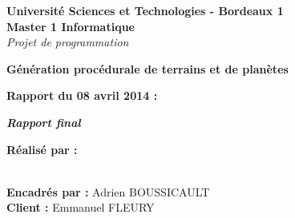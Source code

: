 \documentclass [a4paper,12pt,utf8]{report}
\begin{document}
\begin{titlepage}
\begin{center}
{\bf Université Sciences et Technologies - Bordeaux 1} \vspace{0.5cm}\\

{\bf {\large Master 1 Informatique}}\\
{ \emph{Projet de programmation}}\\\vspace{5cm}



{\huge{\bf Génération procédurale de terrains et de planètes}}\\\vspace{1cm}

{\large{\bf{Rapport du 08 avril 2014 :}}}\vspace{1cm}

{\large\bf\it\rm Rapport final
}\vspace{2cm}


\end{center}


\hspace{1cm}\textbf{Réalisé par :}

\hspace{1cm}{Simon CAULE}

\hspace{1cm}{Pierre HUCHANT}

\hspace{1cm}{Solène JOLLY}

\hspace{1cm}{Adrien LAMOUREUX}\\


\hspace{1cm}\textbf{Encadrés par :} Adrien BOUSSICAULT\\

\hspace{1cm}\textbf{Client :} Emmanuel FLEURY\\

\end{titlepage}

\tableofcontents











\end{document}

